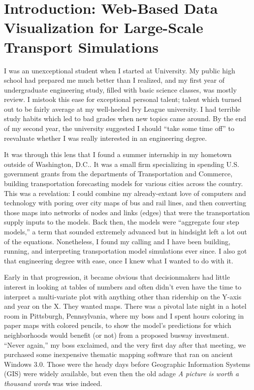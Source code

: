 \hypertarget{introduction-main}{%
\section{Introduction: Web-Based Data Visualization for Large-Scale Transport Simulations}
\label{introduction-main}}

I was an unexceptional student when I started at University. My public high school had prepared me much better than I realized, and my first year of undergraduate engineering study, filled with basic science classes, was mostly review. I mistook this ease for exceptional personal talent; talent which turned out to be fairly average at my well-heeled Ivy League university. I had terrible study habits which led to bad grades when new topics came around. By the end of my second year, the university suggested I should ``take some time off'' to reevaluate whether I was really interested in an engineering degree.

It was through this lens that I found a summer internship in my hometown outside of Washington, D.C.. It was a small firm specializing in spending U.S. government grants from the departments of Transportation and Commerce, building transportation forecasting models for various cities across the country. This was a revelation: I could combine my already-extant love of computers and technology with poring over city maps of bus and rail lines, and then converting those maps into networks of nodes and links (edges) that were the transportation supply inputs to the models. Back then, the models were ``aggregate four step models,'' a term that sounded extremely advanced but in hindsight left a lot out of the equations. Nonetheless, I found my calling and I have been building, running, and interpreting transportation model simulations ever since. I also got that engineering degree with ease, once I knew what I wanted to do with it.

Early in that progression, it became obvious that decisionmakers had little interest in looking at tables of numbers and often didn't even have the time to interpret a multi-variate plot with anything other than ridership on the Y-axis and year on the X. They wanted maps. There was a pivotal late night in a hotel room in Pittsburgh, Pennsylvania, where my boss and I spent hours coloring in paper maps with colored pencils, to show the model's predictions for which neighborhoods would benefit (or not) from a proposed busway investment. ``Never again,'' my boss exclaimed, and the very first day after that meeting, we purchased some inexpensive thematic mapping software that ran on ancient Windows 3.0. Those were the heady days before Geographic Information Systems (GIS) were widely available, but even then the old adage \emph{A picture is worth a thousand words} was wise indeed.

